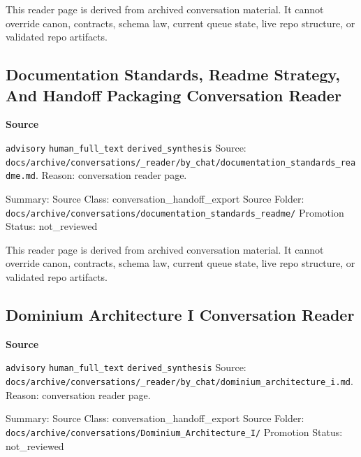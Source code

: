 \documentclass[9pt,a4paper,openany]{book}
\newcommand{\vonecallout}[3]{\par\medskip\noindent\begingroup\setlength{\fboxsep}{7pt}\colorbox{DomCalloutBg}{\parbox{0.94\linewidth}{\textbf{\textcolor{#1}{#2}}\par #3}}\endgroup\par\medskip}
\begin{document}
This reader page is derived from archived conversation material.\allowbreak{} It cannot override canon, contracts, schema law, current queue state, live repo structure, or validated repo artifacts.\allowbreak{}



\subsection{Documentation Standards, Readme Strategy, And Handoff Packaging Conversation Reader}

\vonecallout{DomSlate}{Source}{\texttt{advisory} \texttt{human\_\allowbreak{}full\_\allowbreak{}text} \texttt{derived\_\allowbreak{}synthesis} Source: \texttt{docs/\allowbreak{}archive/\allowbreak{}conversations/\allowbreak{}\_\allowbreak{}reader/\allowbreak{}by\_\allowbreak{}chat/\allowbreak{}documentation\_\allowbreak{}standards\_\allowbreak{}readme.\allowbreak{}md}.\allowbreak{} Reason: conversation reader page.\allowbreak{}}

Summary: Source Class: conversation\_\allowbreak{}handoff\_\allowbreak{}export Source Folder: \texttt{docs/\allowbreak{}archive/\allowbreak{}conversations/\allowbreak{}documentation\_\allowbreak{}standards\_\allowbreak{}readme/\allowbreak{}} Promotion Status: not\_\allowbreak{}reviewed


This reader page is derived from archived conversation material.\allowbreak{} It cannot override canon, contracts, schema law, current queue state, live repo structure, or validated repo artifacts.\allowbreak{}



\subsection{Dominium Architecture I Conversation Reader}

\vonecallout{DomSlate}{Source}{\texttt{advisory} \texttt{human\_\allowbreak{}full\_\allowbreak{}text} \texttt{derived\_\allowbreak{}synthesis} Source: \texttt{docs/\allowbreak{}archive/\allowbreak{}conversations/\allowbreak{}\_\allowbreak{}reader/\allowbreak{}by\_\allowbreak{}chat/\allowbreak{}dominium\_\allowbreak{}architecture\_\allowbreak{}i.\allowbreak{}md}.\allowbreak{} Reason: conversation reader page.\allowbreak{}}

Summary: Source Class: conversation\_\allowbreak{}handoff\_\allowbreak{}export Source Folder: \texttt{docs/\allowbreak{}archive/\allowbreak{}conversations/\allowbreak{}Dominium\_\allowbreak{}Architecture\_\allowbreak{}I/\allowbreak{}} Promotion Status: not\_\allowbreak{}reviewed
\end{document}
